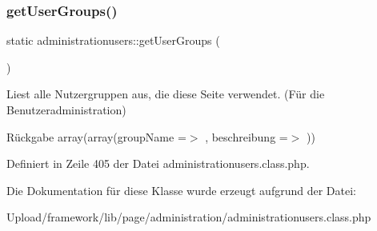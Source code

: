 \subsubsection{\texorpdfstring{get\+User\+Groups()}{getUserGroups()}}
{\footnotesize\ttfamily static administrationusers\+::get\+User\+Groups (\begin{DoxyParamCaption}{ }\end{DoxyParamCaption})\hspace{0.3cm}{\ttfamily [static]}}

Liest alle Nutzergruppen aus, die diese Seite verwendet. (Für die Benutzeradministration) \begin{DoxyReturn}{Rückgabe}
array(array(\textquotesingle{}group\+Name\textquotesingle{} =$>$ \textquotesingle{}\textquotesingle{}, \textquotesingle{}beschreibung\textquotesingle{} =$>$ \textquotesingle{}\textquotesingle{})) 
\end{DoxyReturn}


Definiert in Zeile 405 der Datei administrationusers.\+class.\+php.



Die Dokumentation für diese Klasse wurde erzeugt aufgrund der Datei\+:\begin{DoxyCompactItemize}
\item 
Upload/framework/lib/page/administration/administrationusers.\+class.\+php\end{DoxyCompactItemize}
